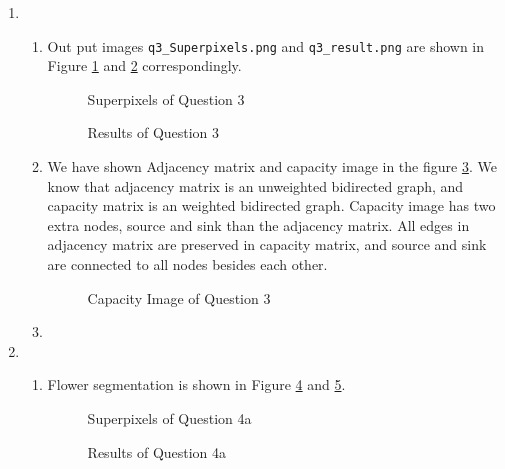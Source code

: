 \documentclass[12pt]{article}
\begin{document}
\begin{enumerate}
	


	\item
	\begin{enumerate}
		\item 
		 Out put images  \texttt{q3\_Superpixels.png} and \texttt{q3\_result.png} are shown in Figure \ref{fig:q3_1} and \ref{fig:q3_2} correspondingly.
		\begin{figure}[H]
			\centering{}
			\caption{Superpixels of Question 3}
			\label{fig:q3_1}
		\end{figure}
		\begin{figure}[H]
			\centering{}
			\caption{Results of Question 3}
			\label{fig:q3_2}
		\end{figure}
	
	\item We have shown Adjacency matrix and capacity image in the figure \ref{fig:q3_3}. We know that adjacency matrix is an unweighted bidirected graph, and capacity matrix is an weighted bidirected graph. Capacity image has two extra nodes, source and sink than the adjacency matrix. All edges in adjacency matrix are preserved in capacity matrix, and source and sink are connected to all nodes besides each other.
	\begin{figure}[H]
		\centering{}
		\caption{Capacity Image of Question 3}
		\label{fig:q3_3}
	\end{figure}

	\item 
	\end{enumerate}

	\item \begin{enumerate}
		\item Flower segmentation is shown in Figure \ref{fig:q4_1_1} and \ref{fig:q4_1_2}.
		\begin{figure}[H]
			\centering{}
			\caption{Superpixels of Question 4a}
			\label{fig:q4_1_1}
		\end{figure}
		\begin{figure}[H]
			\centering{}
			\caption{Results of Question 4a}
			\label{fig:q4_1_2}
		\end{figure}
	
	
		
	\end{enumerate}
	\end{enumerate}
\pagebreak
\end{document}
